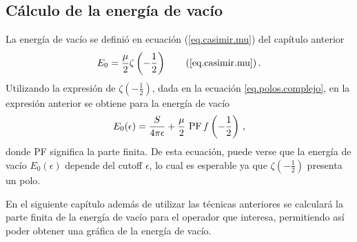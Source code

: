 \subsection{Cálculo de la energía de vacío} 

La energía de vacío se definió en ecuación (\ref{eq.casimir.mu}) del capítulo anterior
\begin{equation*}
    E _0 = \frac{\mu }{2}  
    \zeta  \left( - \frac{1}{2} \right) 
    \tag{\ref{eq.casimir.mu}} \, .
\end{equation*}
Utilizando la expresión de $\zeta \left( - \frac{1}{2} \right)$, dada en la ecuación \eqref{eq.polos.complejo}, en  la expresión anterior se obtiene para la energía de vacío
\begin{equation}
E _0 ( \epsilon )
				= 
				\frac{S}{4 \pi \epsilon }
				+ 
				\frac{\mu}{2} \ {\rm PF} \, f \left( - \frac{1}{2} \right)
\, ,
\end{equation}
donde PF significa la parte finita. De esta ecuación, puede verse que la energía de vacío $E _0 (\epsilon)$ depende del cutoff $\epsilon$, lo cual es esperable ya que $\zeta \left( -\frac{1}{2} \right)$ presenta un polo. 


En el siguiente capítulo además de utilizar las técnicas anteriores se calculará la parte finita de la energía de vacío para el operador que interesa, permitiendo así poder obtener una gráfica de la energía de vacío.
